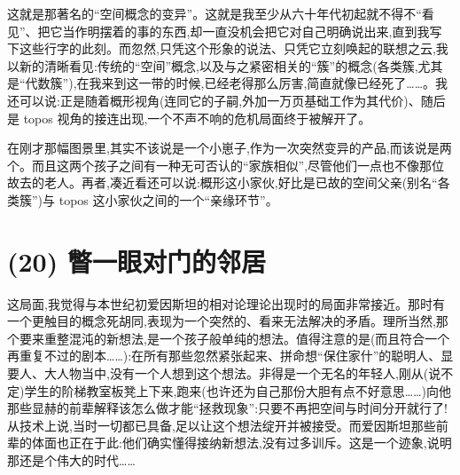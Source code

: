  这就是那著名的“空间概念的变异”。这就是我至少从六十年代初起就不得不“看见”、把它当作明摆着的事的东西,却一直没机会把它对自己明确说出来,直到我写下这些行字的此刻。而忽然,只凭这个形象的说法、只凭它立刻唤起的联想之云,我以新的清晰看见:传统的“空间”概念,以及与之紧密相关的“簇”的概念(各类簇,尤其是“代数簇”),在我来到这一带的时候,已经老得那么厉害,简直就像已经死了……。我还可以说:正是随着概形视角(连同它的子嗣,外加一万页基础工作为其代价)、随后是 topos 视角的接连出现,一个不声不响的危机局面终于被解开了。

在刚才那幅图景里,其实不该说是一个小崽子,作为一次突然变异的产品,而该说是两个。而且这两个孩子之间有一种无可否认的“家族相似”,尽管他们一点也不像那位故去的老人。再者,凑近看还可以说:概形这小家伙,好比是已故的空间父亲(别名“各类簇”)与 topos 这小家伙之间的一个“亲缘环节”。

\section{(20) 瞥一眼对门的邻居}

这局面,我觉得与本世纪初爱因斯坦的相对论理论出现时的局面非常接近。那时有一个更触目的概念死胡同,表现为一个突然的、看来无法解决的矛盾。理所当然,那个要来重整混沌的新想法,是一个孩子般单纯的想法。值得注意的是(而且符合一个再重复不过的剧本……):在所有那些忽然紧张起来、拼命想“保住家什”的聪明人、显要人、大人物当中,没有一个人想到这个想法。非得是一个无名的年轻人,刚从(说不定)学生的阶梯教室板凳上下来,跑来(也许还为自己那份大胆有点不好意思……)向他那些显赫的前辈解释该怎么做才能“拯救现象”:只要不再把空间与时间分开就行了!从技术上说,当时一切都已具备,足以让这个想法绽开并被接受。而爱因斯坦那些前辈的体面也正在于此:他们确实懂得接纳新想法,没有过多训斥。这是一个迹象,说明那还是个伟大的时代……

